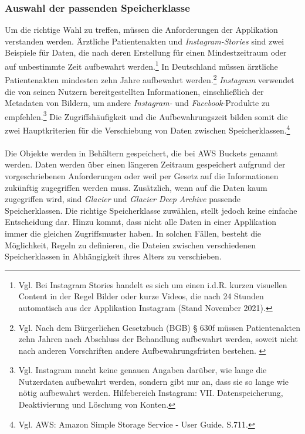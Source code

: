 \subsubsection{Auswahl der passenden Speicherklasse}%
Um die richtige Wahl zu treffen, müssen die Anforderungen der Applikation verstanden werden. Ärztliche Patientenakten und \textit{Instagram-Stories} sind zwei Beispiele für Daten, die nach deren Erstellung für einen Mindestzeitraum oder auf unbestimmte Zeit aufbewahrt %
werden.\footnote{Vgl. Bei Instagram Stories handelt es sich um einen i.d.R. kurzen visuellen Content in der Regel Bilder oder kurze Videos, die nach 24 Stunden automatisch aus der Applikation Instagram  (Stand November 2021).\cite{IG2}} In Deutschland müssen ärztliche Patientenakten mindesten zehn Jahre aufbewahrt werden.\footnote{Vgl. Nach dem Bürgerlichen Gesetzbuch (BGB) § 630f müssen Patientenakten zehn Jahren nach Abschluss der Behandlung aufbewahrt werden, soweit nicht nach anderen Vorschriften andere Aufbewahrungsfristen bestehen. \cite{BGB}} \textit{Instagram} verwendet die von seinen Nutzern bereitgestellten Informationen, einschließlich der Metadaten von Bildern, um andere \textit{Instagram-} und \textit{Facebook}-Produkte zu empfehlen.\footnote{Vgl. Instagram macht keine genauen Angaben darüber, wie lange die Nutzerdaten aufbewahrt werden, sondern gibt nur an, dass sie so lange wie nötig aufbewahrt werden. Hilfebereich Instagram: VII. Datenspeicherung, Deaktivierung und Löschung von Konten\cite{IG3}.}
Die Zugriffshäufigkeit und die Aufbewahrungszeit bilden somit die zwei Hauptkriterien für die Verschiebung von Daten zwischen Speicherklassen.\footnote{Vgl. AWS: Amazon Simple Storage Service - User Guide. S.711.\cite{AMZ18}}
\\\\
Die Objekte werden in Behältern gespeichert, die bei AWS Buckets genannt werden. Daten werden über einen längeren Zeitraum gespeichert aufgrund der vorgeschriebenen Anforderungen oder weil per Gesetz auf die Informationen zukünftig zugegriffen werden muss.
Zusätzlich, wenn auf die Daten kaum zugegriffen wird, sind \textit{Glacier} und \textit{Glacier Deep Archive} passende Speicherklassen. Die richtige Speicherklasse zuwählen, stellt jedoch keine einfache Entscheidung dar. %
Hinzu kommt, dass nicht alle Daten in einer Applikation immer die gleichen Zugriffsmuster haben. In solchen Fällen, besteht die Möglichkeit, Regeln zu definieren, die Dateien zwischen verschiedenen Speicherklassen in Abhängigkeit ihres Alters zu verschieben.
\newpage
